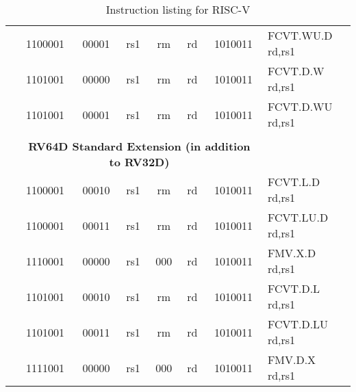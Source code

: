 \begin{table}[p]
\begin{small}
\begin{center}
\begin{tabular}{p{0in}p{0.4in}p{0.05in}p{0.05in}p{0.05in}p{0.05in}p{0.4in}p{0.6in}p{0.4in}p{0.6in}p{0.7in}l}
&
\multicolumn{4}{|c|}{1100001} &
\multicolumn{2}{c|}{00001} &
\multicolumn{1}{c|}{rs1} &
\multicolumn{1}{c|}{rm} &
\multicolumn{1}{c|}{rd} &
\multicolumn{1}{c|}{1010011} & FCVT.WU.D rd,rs1 \\
\cline{2-11}
  

&
\multicolumn{4}{|c|}{1101001} &
\multicolumn{2}{c|}{00000} &
\multicolumn{1}{c|}{rs1} &
\multicolumn{1}{c|}{rm} &
\multicolumn{1}{c|}{rd} &
\multicolumn{1}{c|}{1010011} & FCVT.D.W rd,rs1 \\
\cline{2-11}
  

&
\multicolumn{4}{|c|}{1101001} &
\multicolumn{2}{c|}{00001} &
\multicolumn{1}{c|}{rs1} &
\multicolumn{1}{c|}{rm} &
\multicolumn{1}{c|}{rd} &
\multicolumn{1}{c|}{1010011} & FCVT.D.WU rd,rs1 \\
\cline{2-11}
  

&
\multicolumn{10}{c}{} & \\
&
\multicolumn{10}{c}{\bf RV64D Standard Extension (in addition to RV32D)} & \\
\cline{2-11}
  

&
\multicolumn{4}{|c|}{1100001} &
\multicolumn{2}{c|}{00010} &
\multicolumn{1}{c|}{rs1} &
\multicolumn{1}{c|}{rm} &
\multicolumn{1}{c|}{rd} &
\multicolumn{1}{c|}{1010011} & FCVT.L.D rd,rs1 \\
\cline{2-11}
  

&
\multicolumn{4}{|c|}{1100001} &
\multicolumn{2}{c|}{00011} &
\multicolumn{1}{c|}{rs1} &
\multicolumn{1}{c|}{rm} &
\multicolumn{1}{c|}{rd} &
\multicolumn{1}{c|}{1010011} & FCVT.LU.D rd,rs1 \\
\cline{2-11}
  

&
\multicolumn{4}{|c|}{1110001} &
\multicolumn{2}{c|}{00000} &
\multicolumn{1}{c|}{rs1} &
\multicolumn{1}{c|}{000} &
\multicolumn{1}{c|}{rd} &
\multicolumn{1}{c|}{1010011} & FMV.X.D rd,rs1 \\
\cline{2-11}
  

&
\multicolumn{4}{|c|}{1101001} &
\multicolumn{2}{c|}{00010} &
\multicolumn{1}{c|}{rs1} &
\multicolumn{1}{c|}{rm} &
\multicolumn{1}{c|}{rd} &
\multicolumn{1}{c|}{1010011} & FCVT.D.L rd,rs1 \\
\cline{2-11}
  

&
\multicolumn{4}{|c|}{1101001} &
\multicolumn{2}{c|}{00011} &
\multicolumn{1}{c|}{rs1} &
\multicolumn{1}{c|}{rm} &
\multicolumn{1}{c|}{rd} &
\multicolumn{1}{c|}{1010011} & FCVT.D.LU rd,rs1 \\
\cline{2-11}
  

&
\multicolumn{4}{|c|}{1111001} &
\multicolumn{2}{c|}{00000} &
\multicolumn{1}{c|}{rs1} &
\multicolumn{1}{c|}{000} &
\multicolumn{1}{c|}{rd} &
\multicolumn{1}{c|}{1010011} & FMV.D.X rd,rs1 \\
\cline{2-11}
  

\end{tabular}
\end{center}
\end{small}
\caption{Instruction listing for RISC-V}
\label{instr-table}
\end{table}
  
